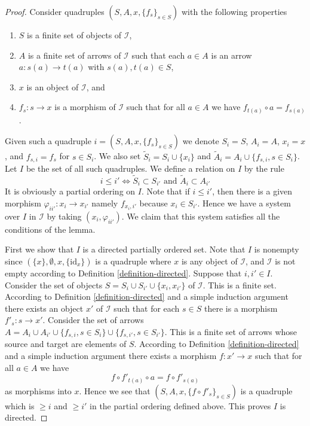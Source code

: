 \begin{proof}
Consider quadruples $(S, A, x, \{f_s\}_{s \in S})$ with the
following properties
\begin{enumerate}
\item $S$ is a finite set of objects of $\mathcal{I}$,
\item $A$ is a finite set of arrows of $\mathcal{I}$ such that
each $a \in A$ is an arrow $a : s(a) \to t(a)$ with $s(a), t(a) \in S$,
\item $x$ is an object of $\mathcal{I}$, and
\item $f_s : s \to x$ is a morphism of $\mathcal{I}$ such that
for all $a \in A$ we have $f_{t(a)} \circ a = f_{s(a)}$.
\end{enumerate}
Given such a quadruple $i = (S, A, x, \{f_s\}_{s \in S})$
we denote $S_i = S$, $A_i = A$, $x_i = x$, and $f_{s, i} = f_s$
for $s \in S_i$. We also set
$\tilde S_i = S_i \cup \{x_i\}$ and
$\tilde A_i = A_i \cup \{f_{s, i}, s \in S_i\}$.
Let $I$ be the set of all such quadruples.
We define a relation on $I$ by the rule
$$
i \leq i' \Leftrightarrow
\tilde S_i \subset S_{i'} \text{ and } \tilde A_i \subset A_{i'}
$$
It is obviously a partial ordering on $I$. Note that if $i \leq i'$,
then there is a given morphism $\varphi_{ii'} : x_i \to x_{i'}$
namely $f_{x_i, i'}$ because $x_i \in S_{i'}$.
Hence we have a system over $I$ in $\mathcal{I}$ by taking
$(x_i, \varphi_{ii'})$. We claim that this system satisfies all
the conditions of the lemma.

\medskip\noindent
First we show that $I$ is a directed partially ordered set.
Note that $I$ is nonempty since $(\{x\}, \emptyset, x, \{\text{id}_x\})$
is a quadruple where $x$ is any object of $\mathcal{I}$, and
$\mathcal{I}$ is not empty according to
Definition \ref{definition-directed}.
Suppose that $i, i' \in I$. Consider the set of objects
$S = S_i \cup S_{i'} \cup \{x_i, x_{i'}\}$ of $\mathcal{I}$.
This is a finite set. According to Definition \ref{definition-directed}
and a simple induction argument there exists an object $x'$ of
$\mathcal{I}$ such that for each $s \in S$ there is a morphism
$f'_s : s \to x'$. Consider the set of arrows
$A = A_i \cup A_{i'} \cup \{f_{s, i}, s \in S_i\}
\cup \{f_{s, i'}, s \in S_{i'}\}$. This is a finite set of
arrows whose source and target are elements of $S$.
According to Definition \ref{definition-directed}
and a simple induction argument there exists a morphism
$f : x' \to x$ such that for all $a \in A$ we have
$$
f \circ f'_{t(a)} \circ a = f \circ f'_{s(a)}
$$
as morphisms into $x$. Hence we see that
$(S, A, x, \{f \circ f'_s\}_{s \in S})$ is a quadruple which is
$\geq i$ and $\geq i'$ in the partial ordering defined above.
This proves $I$ is directed.


\end{proof}
